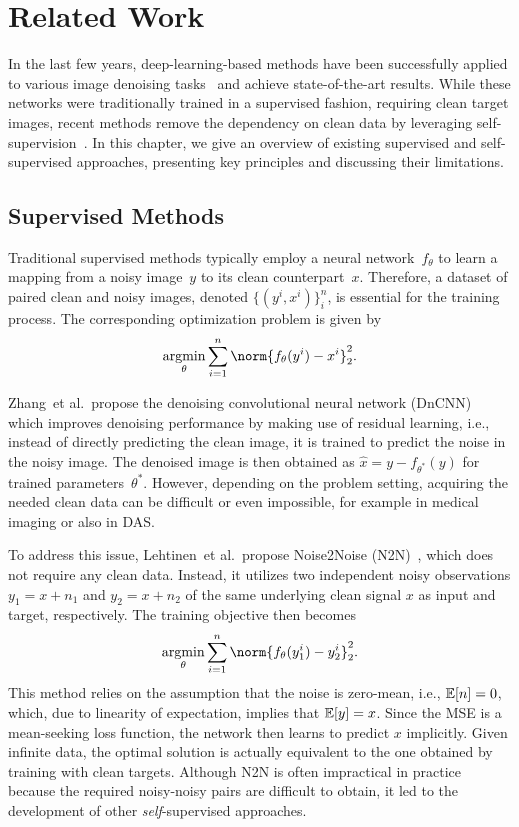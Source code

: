 \chapter{Related Work}

In the last few years, deep-learning-based methods have been successfully applied to various image denoising tasks~\cite{XXX} and achieve state-of-the-art results.
While these networks were traditionally trained in a supervised fashion, requiring clean target images, recent methods remove the dependency on clean data by leveraging self-supervision~\cite{SelfSupervisedDenoising}.
In this chapter, we give an overview of existing supervised and self-supervised approaches, presenting key principles and discussing their limitations.

\section{Supervised Methods}

Traditional supervised methods typically employ a neural network~$f_\theta$ to learn a mapping from a noisy image~$y$ to its clean counterpart~$x$.
Therefore, a dataset of paired clean and noisy images, denoted $\{(y^i,x^i)\}_i^n$, is essential for the training process.
The corresponding optimization problem is given by
\begin{equation}\label{eq:N2C}
    \argmin_\theta \sum_{i=1}^{n} \norm{f_\theta(y^i) - x^i}_2^2.
\end{equation}


Zhang~et al.\ propose the denoising convolutional neural network (DnCNN)~\cite{DnCNN} which improves denoising performance by making use of residual learning, i.e., instead of directly predicting the clean image, it is trained to predict the noise in the noisy image.
The denoised image is then obtained as $\hat{x} = y - f_{\theta^*}(y)$ for trained parameters~$\theta^*$.
However, depending on the problem setting, acquiring the needed clean data can be difficult or even impossible, for example in medical imaging or also in DAS\@.

To address this issue, Lehtinen~et al.\ propose Noise2Noise (N2N)~\cite{N2N}, which does not require any clean data.
Instead, it utilizes two independent noisy observations $y_1 = x + n_1$ and $y_2 = x + n_2$ of the same underlying clean signal $x$ as input and target, respectively.
The training objective then becomes
\begin{equation}\label{eq:N2N}
    \argmin_\theta \sum_{i=1}^{n} \norm{f_\theta(y_1^i) - y_2^i}_2^2.
\end{equation}
This method relies on the assumption that the noise is zero-mean, i.e., $\mathbb{E} [n] = 0$, which, due to linearity of expectation, implies that $\mathbb{E} [y] = x$.
Since the MSE is a mean-seeking loss function, the network then learns to predict $x$ implicitly.
Given infinite data, the optimal solution is actually equivalent to the one obtained by training with clean targets.
Although N2N is often impractical in practice because the required noisy-noisy pairs are difficult to obtain, it led to the development of other \textit{self}-supervised approaches.

